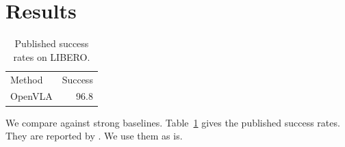 \documentclass{article}
\newcommand{\tabref}[1]{Table~\ref{#1}}
\begin{document}
\section{Results}
\begin{table}[t]
\centering
\caption{Published success rates on LIBERO.}
\label{tab:base}
\begin{tabular}{lr}
Method & Success \\
OpenVLA & 96.8 \\
\end{tabular}
\end{table}

We compare against strong baselines. \tabref{tab:base} gives the published success rates. They are reported by \citet{kim}. We use them as is.



\end{document}
